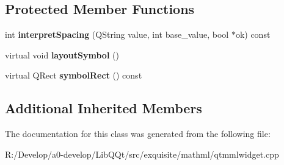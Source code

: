 \subsection*{Protected Member Functions}
\begin{DoxyCompactItemize}
\item 
\mbox{\label{class_mml_mpadded_node_a0c06f5707247d28af5bc1914092f577c}} 
int {\bfseries interpret\+Spacing} (Q\+String value, int base\+\_\+value, bool $\ast$ok) const
\item 
\mbox{\label{class_mml_mpadded_node_a8c64cfd17e8d77ad78961ca46ebbb0d8}} 
virtual void {\bfseries layout\+Symbol} ()
\item 
\mbox{\label{class_mml_mpadded_node_aa0112ec1cf5ea8d056e1ace5eafc4542}} 
virtual Q\+Rect {\bfseries symbol\+Rect} () const
\end{DoxyCompactItemize}
\subsection*{Additional Inherited Members}


The documentation for this class was generated from the following file\+:\begin{DoxyCompactItemize}
\item 
R\+:/\+Develop/a0-\/develop/\+Lib\+Q\+Qt/src/exquisite/mathml/qtmmlwidget.\+cpp\end{DoxyCompactItemize}
